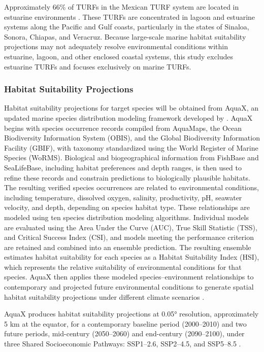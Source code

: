\documentclass[12pt]{article}
\begin{document}
Approximately 66\% of TURFs in the Mexican TURF system are located in estuarine environments \citep{AcevesBueno2023}. These TURFs are concentrated in lagoon and estuarine systems along the Pacific and Gulf coasts, particularly in the states of Sinaloa, Sonora, Chiapas, and Veracruz. Because large-scale marine habitat suitability projections may not adequately resolve environmental conditions within estuarine, lagoon, and other enclosed coastal systems, this study excludes estuarine TURFs and focuses exclusively on marine TURFs.

\subsubsection{Habitat Suitability Projections}

Habitat suitability projections for target species will be obtained from AquaX, an updated marine species distribution modeling framework developed by \citet{Reygondeau2026}. AquaX begins with species occurrence records compiled from AquaMaps, the Ocean Biodiversity Information System (OBIS), and the Global Biodiversity Information Facility (GBIF), with taxonomy standardized using the World Register of Marine Species (WoRMS). Biological and biogeographical information from FishBase and SeaLifeBase, including habitat preferences and depth ranges, is then used to refine these records and constrain predictions to biologically plausible habitats. The resulting verified species occurrences are related to environmental conditions, including temperature, dissolved oxygen, salinity, productivity, pH, seawater velocity, and depth, depending on species habitat type. These relationships are modeled using ten species distribution modeling algorithms. Individual models are evaluated using the Area Under the Curve (AUC), True Skill Statistic (TSS), and Critical Success Index (CSI), and models meeting the performance criterion are retained and combined into an ensemble prediction. The resulting ensemble estimates habitat suitability for each species as a Habitat Suitability Index (HSI), which represents the relative suitability of environmental conditions for that species. AquaX then applies these modeled species–environment relationships to contemporary and projected future environmental conditions to generate spatial habitat suitability projections under different climate scenarios \citep{Reygondeau2026}.

AquaX produces habitat suitability projections at 0.05° resolution, approximately 5 km at the equator, for a contemporary baseline period (2000–2010) and two future periods, mid-century (2050–2060) and end-century (2090–2100), under three Shared Socioeconomic Pathways: SSP1–2.6, SSP2–4.5, and SSP5–8.5 \citep{Reygondeau2026}.
\end{document}
